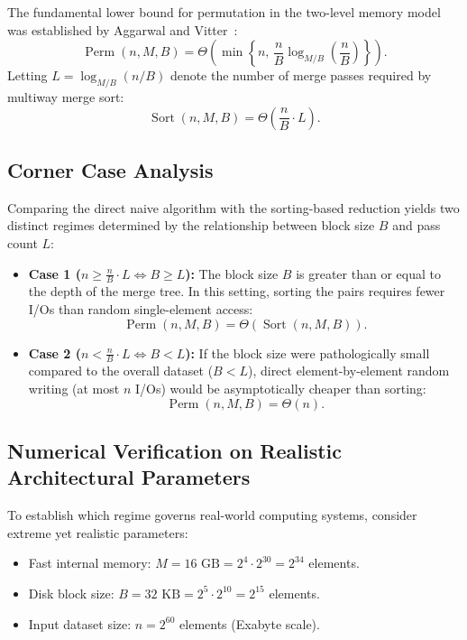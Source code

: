 The fundamental lower bound for permutation in the two-level memory model was established by Aggarwal and Vitter~\cite{aggarwal1988}:
\begin{equation}
  \operatorname{Perm}(n, M, B) = \Theta\left(\min\left\{ n, \, \frac{n}{B} \log_{M/B}\left(\frac{n}{B}\right) \right\}\right).
\end{equation}
Letting $L = \log_{M/B}(n/B)$ denote the number of merge passes required by multiway merge sort:
\begin{equation}
  \operatorname{Sort}(n, M, B) = \Theta\left(\frac{n}{B} \cdot L\right).
\end{equation}

\subsection{Corner Case Analysis}
\label{subsec:corner-cases}

Comparing the direct naive algorithm with the sorting-based reduction yields two distinct regimes determined by the relationship between block size $B$ and pass count $L$:
\begin{itemize}
  \item \textbf{Case 1 ($n \ge \frac{n}{B} \cdot L \iff B \ge L$):}  
  The block size $B$ is greater than or equal to the depth of the merge tree. In this setting, sorting the pairs requires fewer I/Os than random single-element access:
  \[
    \operatorname{Perm}(n, M, B) = \Theta(\operatorname{Sort}(n, M, B)).
  \]
  \item \textbf{Case 2 ($n < \frac{n}{B} \cdot L \iff B < L$):}  
  If the block size were pathologically small compared to the overall dataset ($B < L$), direct element-by-element random writing (at most $n$ I/Os) would be asymptotically cheaper than sorting:
  \[
    \operatorname{Perm}(n, M, B) = \Theta(n).
  \]
\end{itemize}

\subsection{Numerical Verification on Realistic Architectural Parameters}
\label{subsec:numerical-check}

To establish which regime governs real-world computing systems, consider extreme yet realistic parameters:
\begin{itemize}
  \item Fast internal memory: $M = 16\text{ GB} = 2^4 \cdot 2^{30} = 2^{34}$ elements.
  \item Disk block size: $B = 32\text{ KB} = 2^5 \cdot 2^{10} = 2^{15}$ elements.
  \item Input dataset size: $n = 2^{60}$ elements (Exabyte scale).
\end{itemize}

